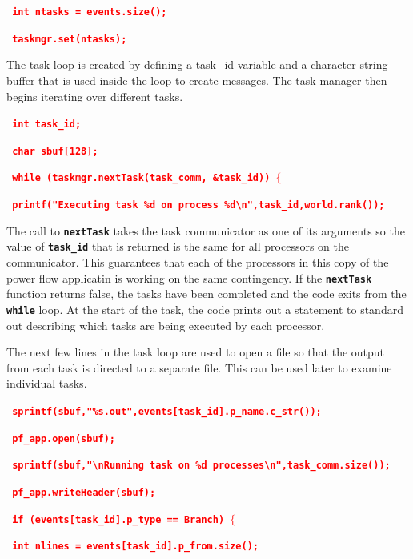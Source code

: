 \documentclass[12pt]{report} %
\begin{document}
\textcolor{red}{\texttt{\textbf{  int ntasks = events.size();}}}

\textcolor{red}{\texttt{\textbf{  taskmgr.set(ntasks);}}}

The task loop is created by defining a task\_id variable and a character string buffer that is used inside the loop to create messages. The task manager then begins iterating over different tasks.

\textcolor{red}{\texttt{\textbf{  int task\_id;}}}

\textcolor{red}{\texttt{\textbf{  char sbuf[128];}}}

\textcolor{red}{\texttt{\textbf{  while (taskmgr.nextTask(task\_comm, \&task\_id)) $\boldsymbol{\mathrm{\{}}$}}}

\textcolor{red}{\texttt{\textbf{    printf("Executing task \%d on process \%d{\textbackslash}n",task\_id,world.rank());}}}

The call to \texttt{\textbf{nextTask}} takes the task communicator as one of its arguments so the value of \texttt{\textbf{task\_id}} that is returned is the same for all processors on the communicator. This guarantees that each of the processors in this copy of the power flow applicatin is working on the same contingency. If the \texttt{\textbf{nextTask}} function returns false, the tasks have been completed and the code exits from the \texttt{\textbf{while}} loop. At the start of the task, the code prints out a statement to standard out describing which tasks are being executed by each processor.

The next few lines in the task loop are used to open a file so that the output from each task is directed to a separate file. This can be used later to examine individual tasks.

\textcolor{red}{\texttt{\textbf{    sprintf(sbuf,"\%s.out",events[task\_id].p\_name.c\_str());}}}

\textcolor{red}{\texttt{\textbf{    pf\_app.open(sbuf);}}}

\textcolor{red}{\texttt{\textbf{    sprintf(sbuf,"{\textbackslash}nRunning task on \%d processes{\textbackslash}n",task\_comm.size());}}}

\textcolor{red}{\texttt{\textbf{    pf\_app.writeHeader(sbuf);}}}

\textcolor{red}{\texttt{\textbf{    if (events[task\_id].p\_type == Branch) $\boldsymbol{\mathrm{\{}}$}}}

\textcolor{red}{\texttt{\textbf{      int nlines = events[task\_id].p\_from.size();}}}
\end{document}
